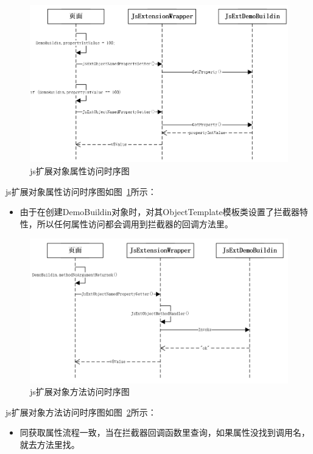 \begin{figure}[H] 
  \centering 
  \includegraphics[width=\textwidth]{image/extension_framework/extension_property_sequence.png} 
  \caption{js扩展对象属性访问时序图} \label{fig:extension_property_sequence} 
\end{figure}

js扩展对象属性访问时序图如图~\ref{fig:extension_property_sequence}所示：
\begin{itemize}
  \item 由于在创建DemoBuildin对象时，对其ObjectTemplate模板类设置了拦截器特性，所以任何属性访问都会调用到拦截器的回调方法里。
\end{itemize}

\begin{figure}[H] 
  \centering 
  \includegraphics[width=\textwidth]{image/extension_framework/extension_function_sequence.png} 
  \caption{js扩展对象方法访问时序图} \label{fig:extension_function_sequence} 
\end{figure}

js扩展对象方法访问时序图如图~\ref{fig:extension_function_sequence}所示：
\begin{itemize}
  \item 同获取属性流程一致，当在拦截器回调函数里查询，如果属性没找到调用名，就去方法里找。
\end{itemize}

